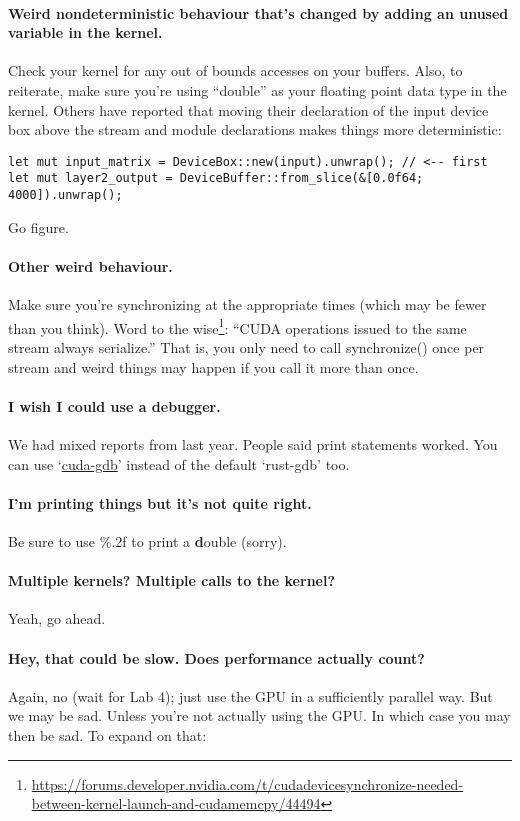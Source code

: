 \paragraph{Weird nondeterministic behaviour that's changed by adding an unused variable in the kernel.} Check your kernel for any out of bounds accesses on your buffers. Also, to reiterate, make sure you're using ``double'' as your floating point data type in the kernel. Others have reported that moving their declaration of the input device box above the stream and module declarations makes things more deterministic:
\begin{verbatim}
let mut input_matrix = DeviceBox::new(input).unwrap(); // <-- first
let mut layer2_output = DeviceBuffer::from_slice(&[0.0f64; 4000]).unwrap();
\end{verbatim}
Go figure.

\paragraph{Other weird behaviour.} Make sure you're synchronizing at the appropriate times (which may be fewer than you think). Word to the wise\footnote{\url{https://forums.developer.nvidia.com/t/cudadevicesynchronize-needed-between-kernel-launch-and-cudamemcpy/44494}}: ``CUDA operations issued to the same stream always serialize.'' That is, you only need to call synchronize() once per stream and weird things may happen if you call it more than once.

\paragraph{I wish I could use a debugger.} We had mixed reports from last year. People said print statements worked. You can use `\href{https://docs.nvidia.com/cuda/cuda-gdb/index.html}{cuda-gdb}' instead of the default `rust-gdb' too.

\paragraph{I'm printing things but it's not quite right.} Be sure to use \%.2f to print a \textbf{d}ouble (sorry).

\paragraph{Multiple kernels? Multiple calls to the kernel?} Yeah, go ahead.

\paragraph{Hey, that could be slow. Does performance actually count?} Again, no (wait for Lab 4); just use the GPU in a sufficiently parallel way. But we may be sad. Unless you're not actually using the GPU. In which case you may then be sad. To expand on that:

